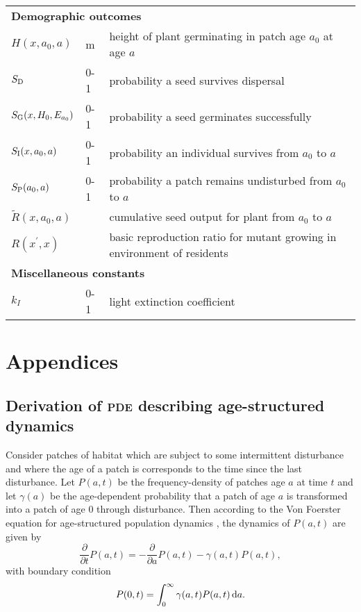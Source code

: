 \documentclass[10pt,twoside]{article}
\begin{document}
\begin{table}[ht]
\begin{tabular}{p{2cm}p{2cm}p{9cm}}
  \multicolumn{3}{l}{\textbf{Demographic outcomes}} \\
  $H(x, a_0, a)$   & m  & height of plant germinating in patch age $a_0$ at age $a$\\
  $S_{\rm D}$ & 0-1 & probability a seed survives dispersal \\
  $S_{\rm G} (x, H_0, E_{a_0})$ & 0-1 & probability a seed germinates successfully \\
  $S_{\rm I} (x, a_0, a)$ & 0-1 & probability an individual survives from $a_0$ to $a$\\
  $S_{\rm P} ( a_0, a)$ & 0-1 & probability a patch remains undisturbed from $a_0$ to $a$\\
  $\tilde{R}(x, a_0, a)$ & & cumulative seed output for plant from $a_0$ to $a$ \\
  $R\left(x^\prime, x\right)$ & & basic reproduction ratio for mutant growing in environment of residents \\

  \multicolumn{3}{l}{\textbf{Miscellaneous constants}} \\
  $k_I$ & 0-1  & light extinction coefficient\\
  \hline
  \end{tabular}
\label{tab:definitions}
\end{table}

\clearpage

\section{Appendices}\label{appendices}

\subsection{Derivation of \textsc{pde} describing age-structured
dynamics}\label{derivation-of-pde-describing-age-structured-dynamics}

Consider patches of habitat which are subject to some intermittent
disturbance and where the age of a patch is corresponds to the time
since the last disturbance. Let \(P(a, t)\) be the frequency-density of
patches age \(a\) at time \(t\) and let \(\gamma(a)\) be the
age-dependent probability that a patch of age \(a\) is transformed into
a patch of age \(0\) through disturbance. Then according to the Von
Foerster equation for age-structured population dynamics
\citep{Vonfoerster-1959}, the dynamics of \(P(a, t)\) are given by
\[ \frac{\partial}{\partial t} P(a, t) = -\frac{\partial}{\partial a} P(a, t)-\gamma(a, t) P(a, t),\]
with boundary condition
\[ P(0, t) = \int^{\infty}_{0}\gamma(a, t) P(a, t) \, {\rm d}a.\]
\end{document}
